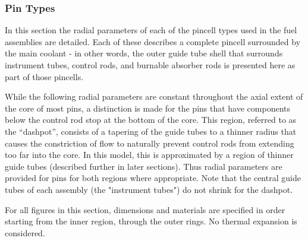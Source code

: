 \subsubsection[Pin Types]{Pin Types\texorpdfstring{\protect{}}{}}
\label{sec:pintypes}

In this section the radial parameters of each of the pincell types used in the
fuel assemblies are detailed. Each of these describes a complete pincell
surrounded by the main coolant - in other words, the outer guide tube shell that
surrounds instrument tubes, control rods, and burnable absorber rods is
presented here as part of those pincells.

While the following radial parameters are constant throughout the axial extent
of the core of most pins, a distinction is made for the pins that have
components below the control rod stop at the bottom of the core. This region,
referred to as the ``dashpot'', consists of a tapering of the guide tubes to a
thinner radius that causes the constriction of flow to naturally prevent control
rods from extending too far into the core. In this model, this is approximated
by a region of thinner guide tubes (described further in later sections). Thus
radial parameters are provided for pins for both regions where appropriate. Note
that the central guide tubes of each assembly (the "instrument tubes") do not
shrink for the dashpot.

For all figures in this section, dimensions and materials are specified in order
starting from the inner region, through the outer rings. No thermal expansion is
considered.






